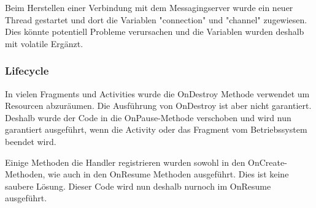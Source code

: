 Beim Herstellen einer Verbindung mit dem Messagingserver wurde ein neuer Thread gestartet und dort die Variablen "connection" und "channel" zugewiesen. Dies könnte potentiell Probleme verursachen und die Variablen wurden deshalb mit volatile Ergänzt.

\subsubsection{Lifecycle}

In vielen Fragments und Activities wurde die OnDestroy Methode verwendet um Resourcen abzuräumen. Die Ausführung von OnDestroy ist aber nicht garantiert. Deshalb wurde der Code in die OnPause-Methode verschoben und wird nun garantiert ausgeführt, wenn die Activity oder das Fragment vom Betriebssystem beendet wird.

Einige Methoden die Handler registrieren wurden sowohl in den OnCreate-Methoden, wie auch in den  OnResume Methoden ausgeführt. Dies ist keine saubere Lösung. Dieser Code wird nun deshalb nurnoch im OnResume ausgeführt.

